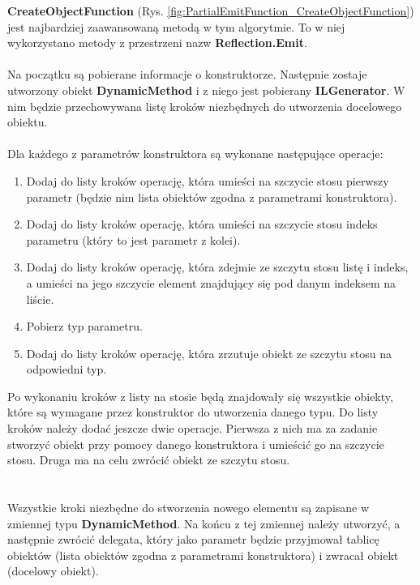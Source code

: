 \documentclass[12pt]{article}
\begin{document}
\textbf{CreateObjectFunction} (Rys. \ref{fig:PartialEmitFunction_CreateObjectFunction}) jest najbardziej zaawansowaną metodą w tym algorytmie. To w niej wykorzystano metody z przestrzeni nazw \textbf{Reflection.Emit}.\\
\\
Na początku są pobierane informacje o konstruktorze. Następnie zostaje utworzony obiekt \textbf{DynamicMethod} i z niego jest pobierany \textbf{ILGenerator}. W nim będzie przechowywana listę kroków niezbędnych do utworzenia docelowego obiektu.\\
\\
Dla każdego z parametrów konstruktora są wykonane następujące operacje:
\begin{enumerate}
	\item Dodaj do listy kroków operację, która umieści na szczycie stosu pierwszy parametr (będzie nim lista obiektów zgodna z parametrami konstruktora).
	\item Dodaj do listy kroków operację, która umieści na szczycie stosu indeks parametru (który to jest parametr z kolei).
	\item Dodaj do listy kroków operację, która zdejmie ze szczytu stosu listę i indeks, a umieści na jego szczycie element znajdujący się pod danym indeksem na liście.
	\item Pobierz typ parametru.
	\item Dodaj do listy kroków operację, która zrzutuje obiekt ze szczytu stosu na odpowiedni typ.
\end{enumerate}
Po wykonaniu kroków z listy na stosie będą znajdowały się wszystkie obiekty, które są wymagane przez konstruktor do utworzenia danego typu. Do listy kroków należy dodać jeszcze dwie operacje. Pierwsza z nich ma za zadanie stworzyć obiekt przy pomocy danego konstruktora i umieścić go na szczycie stosu. Druga ma na celu zwrócić obiekt ze szczytu stosu.\\
\\
\\
Wszystkie kroki niezbędne do stworzenia nowego elementu są zapisane w zmiennej typu \textbf{DynamicMethod}. Na końcu z tej zmiennej należy utworzyć, a następnie zwrócić delegata, który jako parametr będzie przyjmował tablicę obiektów (lista obiektów zgodna z parametrami konstruktora) i zwracał obiekt (docelowy obiekt).\\ \\
\end{document}
